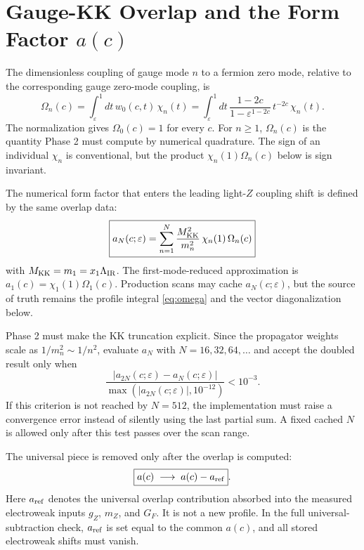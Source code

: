 \documentclass[11pt]{article}
\begin{document}
\section{Gauge-KK Overlap and the Form Factor \texorpdfstring{\(a(c)\)}{a(c)}}

The dimensionless coupling of gauge mode \(n\) to a fermion zero mode,
relative to the corresponding gauge zero-mode coupling, is
\begin{equation}
  \boxed{
  \Omega_n(c) =
  \int_\varepsilon^1 dt\, w_0(c,t)\,\chi_n(t)}
  =
  \int_\varepsilon^1 dt\,
  \frac{1-2c}{1-\varepsilon^{1-2c}}\,
  t^{-2c}\,\chi_n(t).
  \label{eq:omega}
\end{equation}
The normalization gives \(\Omega_0(c)=1\) for every \(c\).  For \(n\ge1\),
\(\Omega_n(c)\) is the quantity Phase 2 must compute by numerical quadrature.
The sign of an individual \(\chi_n\) is conventional, but the product
\(\chi_n(1)\Omega_n(c)\) below is sign invariant.

The numerical form factor that enters the leading light-\(Z\) coupling shift is
defined by the same overlap data:
\begin{equation}
  \boxed{
  a_N(c;\varepsilon) =
  \sum_{n=1}^{N}
  \frac{M_{\rm KK}^2}{m_n^2}\,
  \chi_n(1)\,\Omega_n(c)}
  \label{eq:a-numerical}
\end{equation}
with \(M_{\rm KK}=m_1=x_1\Lambda_{\rm IR}\).  The first-mode-reduced
approximation is \(a_1(c)=\chi_1(1)\Omega_1(c)\).  Production scans may cache
\(a_N(c;\varepsilon)\), but the source of truth remains the profile integral
\eqref{eq:omega} and the vector diagonalization below.

Phase 2 must make the KK truncation explicit.  Since the propagator weights
scale as \(1/m_n^2\sim1/n^2\), evaluate \(a_N\) with
\(N=16,32,64,\ldots\) and accept the doubled result only when
\begin{equation}
  \frac{|a_{2N}(c;\varepsilon)-a_N(c;\varepsilon)|}
       {\max(|a_{2N}(c;\varepsilon)|,10^{-12})}
  < 10^{-3}.
  \label{eq:a-numerical-truncation}
\end{equation}
If this criterion is not reached by \(N=512\), the implementation must raise a
convergence error instead of silently using the last partial sum.  A fixed
cached \(N\) is allowed only after this test passes over the scan range.

The universal piece is removed only after the overlap is computed:
\begin{equation}
  \boxed{a(c)\;\longrightarrow\;a(c)-a_{\rm ref}}.
  \label{eq:aref}
\end{equation}
Here \(a_{\rm ref}\) denotes the universal overlap contribution absorbed into
the measured electroweak inputs \(g_Z\), \(m_Z\), and \(G_F\).  It is not a new
profile.  In the full universal-subtraction check, \(a_{\rm ref}\) is set equal
to the common \(a(c)\), and all stored electroweak shifts must vanish.
\end{document}
